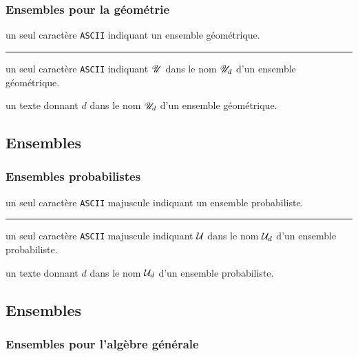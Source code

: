 \documentclass[12pt,a4paper]{book}
\theoremstyle{definition}
\newcommand\separation{
	\medskip
	\hfill\rule{0.5\textwidth}{0.75pt}\hfill
	\medskip
}
\newcommand\ascii{\texttt{ASCII}}
\begin{document}
{{\subsubsection{Ensembles pour la géométrie} 




\IDarg{} un seul caractère \ascii{} indiquant un ensemble géométrique.


\separation



 un seul caractère \ascii{} indiquant $\setgeo{U}$ dans le nom $\setgeo*{U}{d}$ d'un ensemble géométrique.

 un texte donnant $d$ dans le nom $\setgeo*{U}{d}$ d'un ensemble géométrique.




\subsection{Ensembles}

\subsubsection{Ensembles probabilistes}




\IDarg{} un seul caractère \ascii{} majuscule indiquant un ensemble probabiliste.


\separation



 un seul caractère \ascii{} majuscule indiquant $\setproba{U}$ dans le nom $\setproba*{U}{d}$ d'un ensemble probabiliste.

 un texte donnant $d$ dans le nom $\setproba*{U}{d}$ d'un ensemble probabiliste.




\subsection{Ensembles}

\subsubsection{Ensembles pour l'algèbre générale} 



}}
\end{document}
